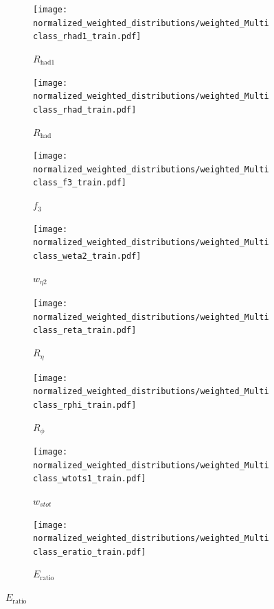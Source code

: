 \begin{figure}[htbp]
  \centering

  \begin{subfigure}[b]{0.47\textwidth}
    \centering
    \texttt{[image: normalized\_weighted\_distributions/weighted\_Multiclass\_rhad1\_train.pdf]}
    \caption{$R_{\text{had1}}$}
    \label{fig:input1}
  \end{subfigure}\hfill
  \begin{subfigure}[b]{0.47\textwidth}
    \centering
    \texttt{[image: normalized\_weighted\_distributions/weighted\_Multiclass\_rhad\_train.pdf]}
    \caption{$R_{\text{had}}$}
    \label{fig:input2}
  \end{subfigure}

  \vspace{0.45cm}

  \begin{subfigure}[b]{0.47\textwidth}
    \centering
    \texttt{[image: normalized\_weighted\_distributions/weighted\_Multiclass\_f3\_train.pdf]}
    \caption{$f_3$}
    \label{fig:input3}
  \end{subfigure}\hfill
  \begin{subfigure}[b]{0.47\textwidth}
    \centering
    \texttt{[image: normalized\_weighted\_distributions/weighted\_Multiclass\_weta2\_train.pdf]}
    \caption{$w_{\eta2}$}
    \label{fig:input4}
  \end{subfigure}

  \vspace{0.45cm}

  \begin{subfigure}[b]{0.47\textwidth}
    \centering
    \texttt{[image: normalized\_weighted\_distributions/weighted\_Multiclass\_reta\_train.pdf]}
    \caption{$R_{\eta}$}
    \label{fig:input5}
  \end{subfigure}\hfill
  \begin{subfigure}[b]{0.47\textwidth}
    \centering
    \texttt{[image: normalized\_weighted\_distributions/weighted\_Multiclass\_rphi\_train.pdf]}
    \caption{$R_{\phi}$}
    \label{fig:input6}
  \end{subfigure}

  \vspace{0.45cm}

  \begin{subfigure}[b]{0.47\textwidth}
    \centering
    \texttt{[image: normalized\_weighted\_distributions/weighted\_Multiclass\_wtots1\_train.pdf]}
    \caption{$w_{stot}$}
    \label{fig:input7}
  \end{subfigure}\hfill
  \begin{subfigure}[b]{0.47\textwidth}
    \centering
    \texttt{[image: normalized\_weighted\_distributions/weighted\_Multiclass\_eratio\_train.pdf]}
    \caption{$E_{\text{ratio}}$}
    \label{fig:input8}
  \end{subfigure}

  \label{fig:dnn_inputs_distributions}
\end{figure}

